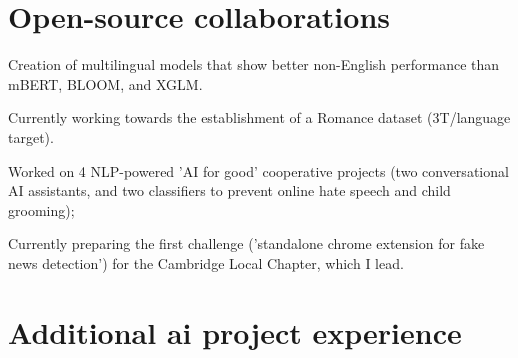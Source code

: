 \documentclass[]{plushcv}
\begin{document}
\begin{minipage}[t]{0.70\textwidth}
\section{Open-source collaborations}

\begin{tightemize}
\item Creation of multilingual models that show better non-English performance than mBERT, BLOOM, and XGLM.
\item Currently working towards the establishment of a Romance dataset (3T/language target). 
\end{tightemize}
\sectionsep

\begin{tightemize}
\item Worked on 4 NLP-powered 'AI for good' cooperative projects (two conversational AI assistants, and two classifiers to prevent online hate speech and child grooming);
\item Currently preparing the first challenge ('standalone chrome extension for fake news detection') for the Cambridge Local Chapter, which I lead.
\end{tightemize}
\sectionsep


\vspace*{-2mm}
\section{Additional ai project experience}



\end{minipage}
\end{document}
